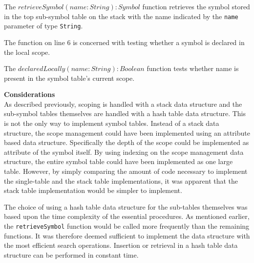 The $retrieveSymbol(name: String): Symbol$ function retrieves the symbol stored in the top sub-symbol table on the stack with the name indicated by the \texttt{name} parameter of type \texttt{String}.

The function on line 6 is concerned with testing whether a symbol is declared in the local scope.

The $declaredLocally(name: String): Boolean$ function tests whether name is present in the symbol table's current scope.

\textbf{Considerations}\\
As described previously, scoping is handled with a stack data structure and the sub-symbol tables themselves are handled with a hash table data structure.
This is not the only way to implement symbol tables.
Instead of a stack data structure, the scope management could have been implemented using an attribute based data structure.
Specifically the depth of the scope could be implemented as attribute of the symbol itself.
By using indexing on the scope management data structure, the entire symbol table could have been implemented as one large table.
However, by simply comparing the amount of code necessary to implement the single-table and the stack table implementations, it was apparent that the stack table implementation would be simpler to implement.

The choice of using a hash table data structure for the sub-tables themselves was based upon the time complexity of the essential procedures.
As mentioned earlier, the \texttt{retrieveSymbol} function would be called more frequently than the remaining functions.
It was therefore deemed sufficient to implement the data structure with the most efficient search operations.
Insertion or retrieval in a hash table data structure can be performed in constant time.
